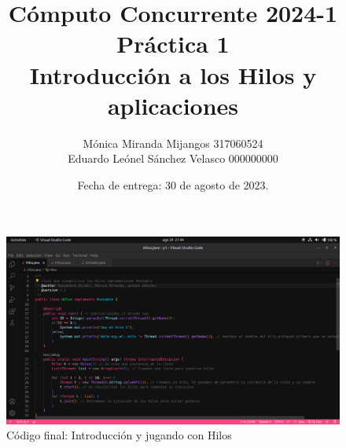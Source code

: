 \documentclass[12pt]{extarticle} %
\title{Cómputo Concurrente 2024-1 \\ Práctica 1 \\
Introducción a los Hilos y aplicaciones}
\author{Mónica Miranda Mijangos \hspace{1.8cm} 317060524\\
Eduardo Leónel Sánchez Velasco \hspace{5mm} 000000000}
\date{Fecha de entrega: 30 de agosto de 2023.}
\begin{document}
    
\begin{figure}
    \centering
    \includegraphics[scale=0.3]{p1_ej1.png}
    \caption{Código final: Introducción y jugando con Hilos}
    \label{fig:enter-label}
\end{figure}
\end{document}
